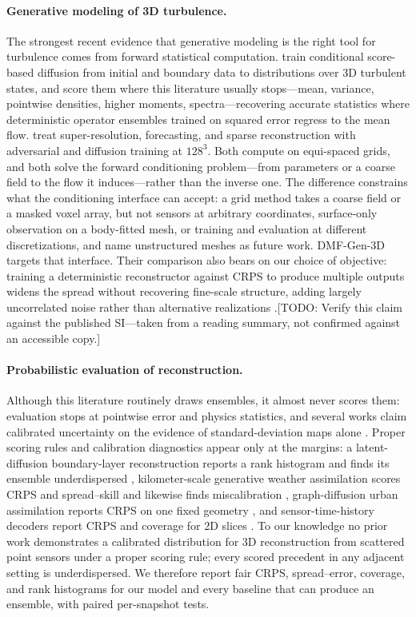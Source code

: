 \documentclass{article} %
\newcommand{\todo}[1]{{\color{red}[TODO: #1]}}
\newcommand{\model}{DMF-Gen-3D}
\begin{document}
\paragraph{Generative modeling of 3D turbulence.}
The strongest recent evidence that generative modeling is the right tool for turbulence comes from forward statistical computation. \citet{raonic2026gencfd} train conditional score-based diffusion from initial and boundary data to distributions over 3D turbulent states, and score them where this literature usually stops---mean, variance, pointwise densities, higher moments, spectra---recovering accurate statistics where deterministic operator ensembles trained on squared error regress to the mean flow. \citet{oommen2026turbulent} treat super-resolution, forecasting, and sparse reconstruction with adversarial and diffusion training at $128^3$. Both compute on equi-spaced grids, and both solve the forward conditioning problem---from parameters or a coarse field to the flow it induces---rather than the inverse one. The difference constrains what the conditioning interface can accept: a grid method takes a coarse field or a masked voxel array, but not sensors at arbitrary coordinates, surface-only observation on a body-fitted mesh, or training and evaluation at different discretizations, and \citet{oommen2026turbulent} name unstructured meshes as future work. \model{} targets that interface. Their comparison also bears on our choice of objective: training a deterministic reconstructor against CRPS to produce multiple outputs widens the spread without recovering fine-scale structure, adding largely uncorrelated noise rather than alternative realizations \citep{raonic2026gencfd}.\todo{Verify this claim against the published SI---taken from a reading summary, not confirmed against an accessible copy.}

\paragraph{Probabilistic evaluation of reconstruction.}
Although this literature routinely draws ensembles, it almost never scores them: evaluation stops at pointwise error and physics statistics, and several works claim calibrated uncertainty on the evidence of standard-deviation maps alone \citep{wang2025geofunflow,parikh2026conditional,yang2025pis}. Proper scoring rules and calibration diagnostics \citep{gneiting2007strictly} appear only at the margins: a latent-diffusion boundary-layer reconstruction reports a rank histogram and finds its ensemble underdispersed \citep{rybchuk2023ensemble}, kilometer-scale generative weather assimilation scores CRPS and spread--skill and likewise finds miscalibration \citep{manshausen2025generative}, graph-diffusion urban assimilation reports CRPS on one fixed geometry \citep{giral2026genda}, and sensor-time-history decoders report CRPS and coverage for 2D slices \citep{gao2026uqshred}. To our knowledge no prior work demonstrates a calibrated distribution for 3D reconstruction from scattered point sensors under a proper scoring rule; every scored precedent in any adjacent setting is underdispersed. We therefore report fair CRPS, spread--error, coverage, and rank histograms for our model and every baseline that can produce an ensemble, with paired per-snapshot tests.
\end{document}
